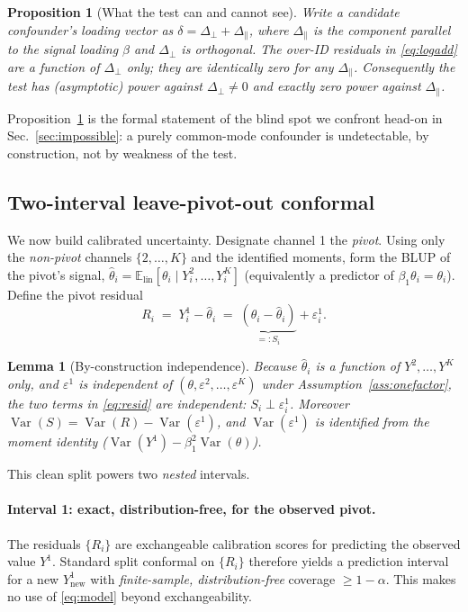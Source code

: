 \documentclass[11pt]{article}
\newtheorem{proposition}{Proposition}
\newtheorem{lemma}{Lemma}
\theoremstyle{definition}
\theoremstyle{remark}
\newcommand{\Var}{\operatorname{Var}}
\newcommand{\E}{\mathbb{E}}
\newcommand{\thh}{\widehat{\theta}}
\newcommand{\eps}{\varepsilon}
\newcommand{\dperp}{\Delta_{\perp}}
\newcommand{\dpar}{\Delta_{\parallel}}
\begin{document}
\begin{proposition}[What the test can and cannot see]\label{prop:power}
Write a candidate confounder's loading vector as $\delta = \dperp + \dpar$,
where $\dpar$ is the component parallel to the signal loading $\beta$ and
$\dperp$ is orthogonal. The over-ID residuals in \eqref{eq:logadd} are a
function of $\dperp$ only; they are identically zero for any $\dpar$.
Consequently the test has (asymptotic) power against $\dperp\ne 0$ and
\emph{exactly zero} power against $\dpar$.
\end{proposition}

Proposition~\ref{prop:power} is the formal statement of the blind spot we
confront head-on in Sec.~\ref{sec:impossible}: a purely common-mode
confounder is undetectable, by construction, not by weakness of the test.

\subsection{Two-interval leave-pivot-out conformal}\label{sec:conformal}

We now build calibrated uncertainty. Designate channel 1 the \emph{pivot}.
Using only the \emph{non-pivot} channels $\{2,\dots,K\}$ and the identified
moments, form the BLUP of the pivot's signal,
$\thh_i = \E_{\text{lin}}[\theta_i \mid Y^2_i,\dots,Y^K_i]$ (equivalently a
predictor of $\beta_1\theta_i=\theta_i$). Define the pivot residual
\begin{equation}\label{eq:resid}
R_i \;=\; Y^1_i - \thh_i \;=\; \underbrace{(\theta_i - \thh_i)}_{=:S_i} + \eps^{1}_i .
\end{equation}

\begin{lemma}[By-construction independence]\label{lem:indep}
Because $\thh_i$ is a function of $Y^2,\dots,Y^K$ only, and $\eps^1$ is
independent of $(\theta,\eps^2,\dots,\eps^K)$ under
Assumption~\ref{ass:onefactor}, the two terms in \eqref{eq:resid} are
independent: $S_i \perp \eps^1_i$. Moreover
$\Var(S) = \Var(R) - \Var(\eps^1)$, and $\Var(\eps^1)$ is identified from the
moment identity ($\Var(Y^1)-\beta_1^2\Var(\theta)$).
\end{lemma}

This clean split powers two \emph{nested} intervals.

\paragraph{Interval 1: exact, distribution-free, for the observed pivot.}
The residuals $\{R_i\}$ are exchangeable calibration scores for predicting
the observed value $Y^1$. Standard split conformal on $\{R_i\}$ therefore
yields a prediction interval for a new $Y^1_{\text{new}}$ with
\emph{finite-sample, distribution-free} coverage $\ge 1-\alpha$. This makes
no use of \eqref{eq:model} beyond exchangeability.
\end{document}
